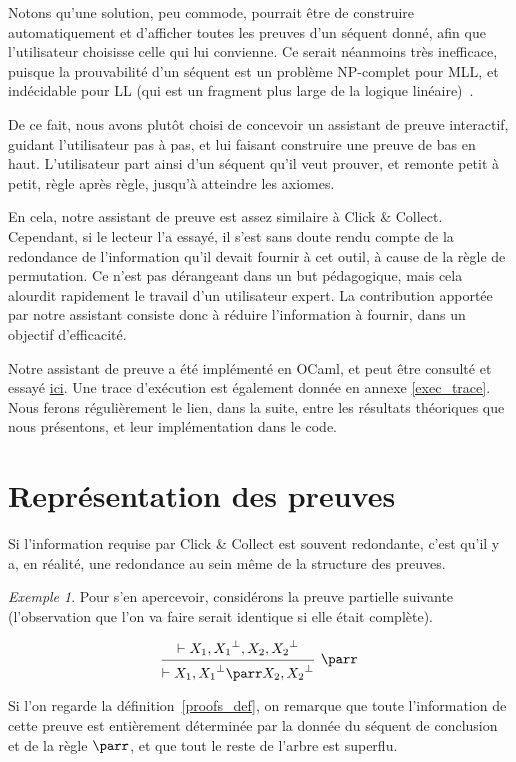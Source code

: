 \documentclass[11pt,a4paper]{article}
\theoremstyle{plain}
\theoremstyle{definition}
\theoremstyle{remark}
\newtheorem{example}{Exemple}
\newcommand*{\orth}{^\perp}
\newcommand*{\hypv}[1]{\hypo{\vdash #1}}
\newcommand*{\parrv}[1]{\infer{1}[\ensuremath{\parr}]{\vdash #1}}
\begin{document}
Notons qu'une solution, peu commode, pourrait être de construire automatiquement et d'afficher toutes les preuves d'un séquent donné, afin que l'utilisateur choisisse celle qui lui convienne. Ce serait néanmoins très inefficace, puisque la prouvabilité d'un séquent est un problème NP-complet pour MLL, et indécidable pour LL (qui est un fragment plus large de la logique linéaire)~\cite{Lincoln_1995}.

De ce fait, nous avons plutôt choisi de concevoir un assistant de preuve interactif, guidant l'utilisateur pas à pas, et lui faisant construire une preuve de bas en haut. L'utilisateur part ainsi d'un séquent qu'il veut prouver, et remonte petit à petit, règle après règle, jusqu'à atteindre les axiomes.

En cela, notre assistant de preuve est assez similaire à Click \& Collect. Cependant, si le lecteur l'a essayé, il s'est sans doute rendu compte de la redondance de l'information qu'il devait fournir à cet outil, à cause de la règle de permutation. Ce n'est pas dérangeant dans un but pédagogique, mais cela alourdit rapidement le travail d'un utilisateur expert. La contribution apportée par notre assistant consiste donc à réduire l'information à fournir, dans un objectif d'efficacité.

Notre assistant de preuve a été implémenté en OCaml, et peut être consulté et essayé \href{https://github.com/jonas-trms/mll_prover}{ici}. Une trace d'exécution est également donnée en annexe \ref{exec_trace}. Nous ferons régulièrement le lien, dans la suite, entre les résultats théoriques que nous présentons, et leur implémentation dans le code.

\section{Représentation des preuves}
Si l'information requise par Click \& Collect est souvent redondante, c'est qu'il y a, en réalité, une redondance au sein même de la structure des preuves.

\begin{example}
    Pour s'en apercevoir, considérons la preuve partielle suivante (l'observation que l'on va faire serait identique si elle était complète).

    \begin{equation*}
        \begin{prooftree}
            \hypv{X_1, {X_1}\orth, X_2, {X_2}\orth}
            \parrv{X_1, {X_1}\orth \parr X_2, {X_2}\orth}
        \end{prooftree}
    \end{equation*}
    

    Si l'on regarde la définition~\ref{proofs_def}, on remarque que toute l'information de cette preuve est entièrement déterminée par la donnée du séquent de conclusion et de la règle $\parr$, et que tout le reste de l'arbre est superflu.
\end{example}
\end{document}
